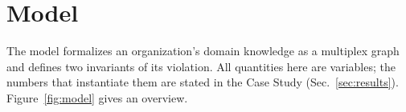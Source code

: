 \section{Model}
\label{sec:model}

The model formalizes an organization's domain knowledge as a multiplex graph and defines two invariants of its
violation. All quantities here are variables; the numbers that instantiate them are stated in the
Case Study (Sec.~\ref{sec:results}). Figure~\ref{fig:model} gives an overview.


